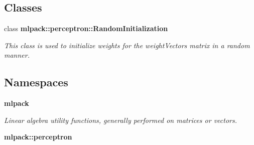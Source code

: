 \subsection*{Classes}
\begin{DoxyCompactItemize}
\item 
class {\bf mlpack\+::perceptron\+::\+Random\+Initialization}
\begin{DoxyCompactList}\small\item\em This class is used to initialize weights for the weight\+Vectors matrix in a random manner. \end{DoxyCompactList}\end{DoxyCompactItemize}
\subsection*{Namespaces}
\begin{DoxyCompactItemize}
\item 
 {\bf mlpack}
\begin{DoxyCompactList}\small\item\em Linear algebra utility functions, generally performed on matrices or vectors. \end{DoxyCompactList}\item 
 {\bf mlpack\+::perceptron}
\end{DoxyCompactItemize}
